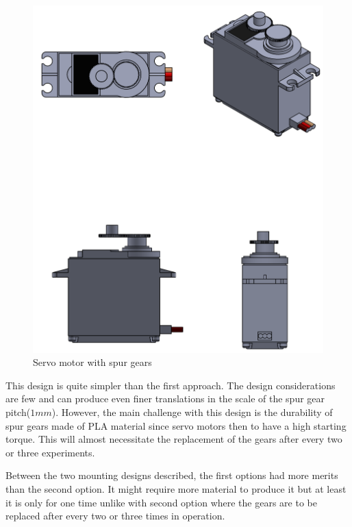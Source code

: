 \begin{enumerate}
\begin{enumerate}
\begin{enumerate}
\begin{itemize}
\begin{figure}[H]
                  \includegraphics{Figures/ServoMotorWithSpurGears.PNG}
                  \caption{Servo motor with spur gears}
                  \label{fig:servo_motor_with_spur_gears}
              \end{figure}
              This design is quite simpler than the first approach. The design considerations are few and can produce even finer translations in the scale of the spur gear pitch($1 mm$). However, the main challenge with this design is the durability of spur gears made of PLA material since servo motors then to have a high starting torque. This will almost necessitate the replacement of the gears after every two or three experiments.  
          \end{itemize}
     \end{enumerate}
     \par
     Between the two mounting designs described, the first options had more merits than the second option. It might require more material to produce it but at least it is only for one time unlike with second option where the gears are to be replaced after every two or three times in operation.
     \par 

\end{enumerate}
\end{enumerate}
